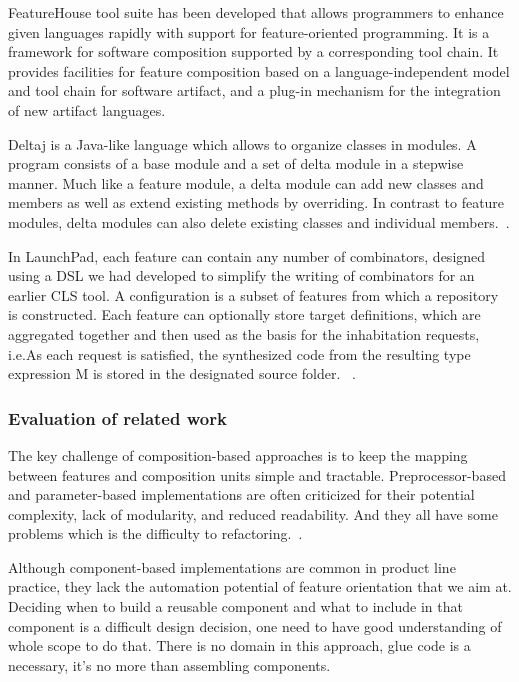 FeatureHouse tool suite has been developed that allows programmers to enhance given languages rapidly with
support for feature-oriented programming. It is a framework for software composition supported by a
corresponding tool chain. It provides facilities for feature  composition based on a language-independent
model and tool chain for software artifact, and a plug-in mechanism for the integration of new artifact
languages.~\cite{Apel:2009:FLA:1555001.1555038}

Deltaj is a Java-like language which allows to organize classes in modules. A program consists of a base
 module and a set of delta module in a stepwise manner. Much like a feature module, a delta module can add
 new classes and members as well as extend existing methods by overriding. In contrast to feature modules,
 delta modules can also delete existing classes and individual members.~\cite{Schaefer:2010:DPS:1885639.1885647}.

In LaunchPad, each feature can contain any number of combinators, designed using a DSL we had developed to
simplify the writing of combinators for an earlier CLS tool. A configuration is a subset of features from
which a repository is constructed. Each feature can optionally store target definitions, which are aggregated
 together and then used as the basis for the inhabitation requests, i.e.As each request is satisfied, the
 synthesized code from the resulting type expression M is stored in the designated source folder.
~\cite{Heineman:2015:TMO:2791060.2791076}.

\subsubsection{Evaluation of related work}

The key challenge of composition-based approaches is to keep the mapping between features and composition units
simple and tractable. Preprocessor-based and parameter-based implementations are often criticized for their
potential complexity, lack of modularity, and reduced readability. And they all have some problems which is the
difficulty to refactoring.~\cite{Kim:2017:RJS:3106195.3106201}.

Although component-based implementations are common in product line practice, they lack the automation potential
of feature orientation that we aim at. Deciding when to build a reusable component and what to include in
that component is a difficult design decision, one need to have good understanding of whole scope to do that.
There is no domain in this approach, glue code is a necessary, it's no more than assembling components.
~\cite{Apel:2013:FSP:2541773}

